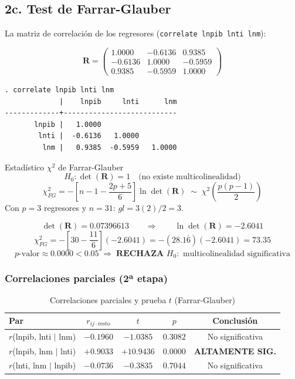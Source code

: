 \documentclass[12pt,a4paper]{article}
\begin{document}
\subsection{2c. Test de Farrar-Glauber}

La matriz de correlación de los regresores (\texttt{correlate lnpib lnti lnm}):

\[
\mathbf{R}=\begin{pmatrix}
1.0000 & -0.6136 & 0.9385\\
-0.6136 & 1.0000 & -0.5959\\
0.9385 & -0.5959 & 1.0000
\end{pmatrix}
\]

\begin{statabox}
\begin{lstlisting}[style=Stata]
. correlate lnpib lnti lnm
             |    lnpib     lnti      lnm
-------------+---------------------------
       lnpib |   1.0000
        lnti |  -0.6136   1.0000
         lnm |   0.9385  -0.5959   1.0000
\end{lstlisting}
\end{statabox}

\begin{frmbox}{Estadístico $\chi^2$ de Farrar-Glauber}
\[H_0:\det(\mathbf{R})=1\quad\text{(no existe multicolinealidad)}\]
\[\chi^2_{FG}=-\!\left[n-1-\frac{2p+5}{6}\right]\!\ln\!\det(\mathbf{R})
\;\sim\;\chi^2\!\!\left(\frac{p(p-1)}{2}\right)\]
Con $p=3$ regresores y $n=31$: $gl=3(2)/2=3$.
\end{frmbox}

\[\det(\mathbf{R})=0.07396613\qquad\Rightarrow\qquad\ln\det(\mathbf{R})=-2.6041\]
\[\chi^2_{FG}=-\!\left[30-\frac{11}{6}\right](-2.6041)=-(28.1\overline{6})(-2.6041)=\mathbf{73.35}\]
\[p\text{-valor}\approx0.0000<0.05\;\Rightarrow\;\textbf{RECHAZA }H_0:\text{ multicolinealidad significativa}\]

\subsubsection{Correlaciones parciales (2ª etapa)}

\begin{table}[H]\centering
\caption{Correlaciones parciales y prueba $t$ (Farrar-Glauber)}
\begin{tabular}{lcccc}
\toprule
\textbf{Par} & $r_{ij\cdot\text{resto}}$ & $t$ & $p$ & \textbf{Conclusión}\\
\midrule
$r$(lnpib, lnti $\mid$ lnm) & $-0.1960$ & $-1.0385$ & $0.3082$ & No significativa\\
\rowcolor{rojo_a!10}$r$(lnpib, lnm $\mid$ lnti) & $\mathbf{+0.9033}$ & $\mathbf{+10.9436}$ &
  $\mathbf{0.0000}$ & \textbf{ALTAMENTE SIG.}\\
$r$(lnti, lnm $\mid$ lnpib) & $-0.0736$ & $-0.3835$ & $0.7044$ & No significativa\\
\bottomrule
\end{tabular}
\end{table}
\end{document}
